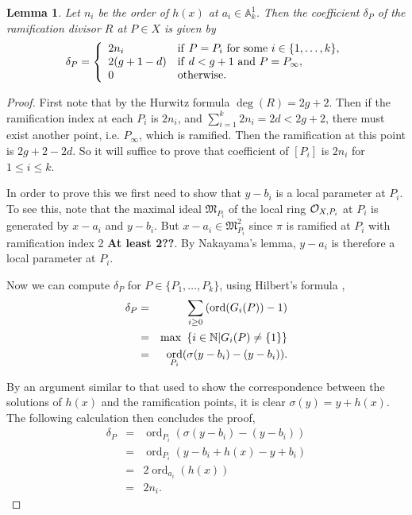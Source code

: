 \documentclass[11pt]{article} %
\newtheorem{lem}{Lemma}
\theoremstyle{remark}\newtheorem*{rem}{Remark}
\newcommand{\cO}{{\cal O}}
\newcommand{\NN}{{\mathbb N}}
\DeclareMathOperator{\ord}{ord}
\begin{document}
\begin{lem}
 Let $n_i$ be the order of $h(x)$ at $a_i\in \mathbb A_k^1$.
Then the coefficient $\delta_P$ of the ramification divisor $R$ at $P\in X$ is given by
\[
 \delta_P = \left\{
 \begin{array}{ll}
 2n_i & {\rm if }\ P=P_i\ {\rm for\ some }\ i \in \{1,\ldots ,k\}, \\
 2(g+1-d) & {\rm if }\ d<g+1\ {\rm and }\ P=P_\infty, \\
 0 & {\rm otherwise.} 
 \end{array}
\right.
\]
\end{lem}
\begin{proof}
 First note that by the Hurwitz formula $\deg(R) = 2g+2$.
 Then if the ramification index at each $P_i$ is $2n_i$, and $\sum_{i=1}^k 2n_i = 2d < 2g+2$, there must exist another point, i.e. $P_{\infty}$, which is ramified.
 Then the ramification at this point is $2g+2-2d$.
 So it will suffice to prove that coefficient of $[P_i]$ is $2n_i$ for $1\leq i \leq k$.
 
 In order to prove this we first need to show that $y-b_i$ is a local parameter at $P_i$.
 To see this, note that the maximal ideal $\mathfrak M_{P_i}$ of the local ring $\cO_{X,P_i}$ at $P_i$ is generated by $x-a_i$ and $y-b_i$.
 But $x-a_i\in \mathfrak M_{P_i}^2$ since $\pi$ is ramified at $P_i$ with ramification index 2 {\bf At least 2??}.
 By Nakayama's lemma, $y-a_i$ is therefore a local parameter at $P_i$.
 
 Now we can compute $\delta_P$ for $P\in \{P_1,\ldots , P_k\}$, using Hilbert's formula \cite[Prop. 4, \S 1, Ch. IV]{localfields},
 \begin{eqnarray*}
  \delta_P & = & \sum_{i\geq 0} \left(\ord(G_i(P))-1\right) \\
  & = & {\rm max\ }\left\{ i\in \NN | G_i(P)\neq \{1\}\right\} \\
  & = & \ord_{P_i}(\sigma(y-b_i) - (y-b_i)).
  \end{eqnarray*}
  
 By an argument similar to that used to show the correspondence between the solutions of $h(x)$ and the ramification points, it is clear $\sigma(y)=y+h(x)$.
 The following calculation then concludes the proof,
  \begin{eqnarray*}
  \delta_P & = & \ord_{P_i}(\sigma(y-b_i) - (y-b_i)) \\
  & = & \ord_{P_i}(y-b_i+h(x) - y + b_i) \\
  & = & 2\ord_{a_i}(h(x)) \\
  & = & 2n_i.
 \end{eqnarray*}
\end{proof}
\end{document}
